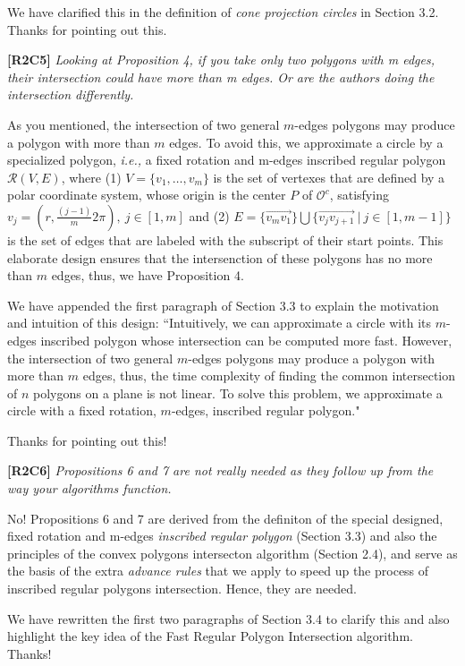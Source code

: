 \documentclass{letter}
\newcommand{\ie}{\emph{i.e.,}\xspace}
\newcommand{\pcircle}[1]{{$\mathcal{O}^c{#1}$}}
\begin{document}
We have clarified this in the definition of \emph{cone projection circles} in Section 3.2. Thanks for pointing out this.

\textbf{[R2C5]} \emph{Looking at Proposition 4, if you take only two polygons with m edges, their intersection could have more than m edges. Or are the authors doing the intersection differently.}

As you mentioned, the intersection of two {general} $m$-edges polygons may produce a polygon with more than $m$ edges. To avoid this, we approximate a circle by a {specialized} polygon, \ie a fixed rotation and m-edges inscribed regular polygon $\mathcal{R}(V, E)$,
where (1) $V=\{v_1, \ldots, v_{m}\}$ is the set of vertexes that are defined by a polar coordinate system, whose origin is the center $P$ of \pcircle{}, satisfying $v_j = (r, \frac{(j-1)}{m}2\pi), ~j \in [1, m]$
and (2) $E= \{\overrightarrow{v_mv_1}\} \bigcup \{\overrightarrow{v_jv_{j+1}}\ |\ j\in [1, m-1]\}$ is the set of edges that are labeled with the subscript of their start points.
This elaborate design ensures that the intersenction of these polygons has no more than $m$ edges, thus, we have Proposition 4.

We have appended the first paragraph of Section 3.3 to explain the motivation and intuition of this design: ``Intuitively, we can approximate a circle with its $m$-edges inscribed polygon {whose intersection can be computed more fast}. However, the intersection of two general $m$-edges polygons may produce a polygon with more than $m$ edges, thus, the time complexity of finding the common intersection of $n$ polygons on a plane is not linear. To solve this problem, we approximate a circle with a fixed rotation, $m$-edges, inscribed regular polygon."

Thanks for pointing out this!

\textbf{[R2C6]} \emph{Propositions 6 and 7 are not really needed as they follow up from the way your algorithms function.}

No! Propositions 6 and 7 are derived from the definiton of the special designed, fixed rotation and m-edges \emph{inscribed regular polygon} (Section 3.3) and also the principles of the convex polygons intersecton algorithm (Section 2.4), and serve as the basis of the extra \emph{advance rules} that we apply to speed up the process of inscribed regular polygons intersection. Hence, they are needed.

We have rewritten the first two paragraphs of Section 3.4 to clarify this and also highlight the key idea of the Fast Regular Polygon Intersection algorithm. Thanks!
\end{document}
